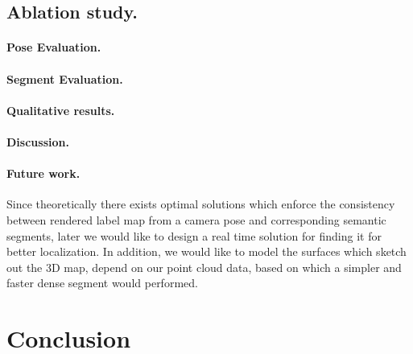 \documentclass[10pt,twocolumn,letterpaper]{article}
\begin{document}
\subsection{Ablation study.}

\paragraph{Pose Evaluation.}

\paragraph{Segment Evaluation.}

\paragraph{Qualitative results.}

\paragraph{Discussion.}

\paragraph{Future work.} Since theoretically there exists optimal solutions which enforce the consistency between rendered label map from a camera pose and corresponding semantic segments, 
later we would like to design a real time solution for finding it for better localization.
In addition, we would like to model the surfaces which sketch out the 3D map, depend on our point cloud data, based on which a simpler and faster dense segment would performed.


\section{Conclusion}
\label{sec:conclusion}

% 
{\small


}
\end{document}
